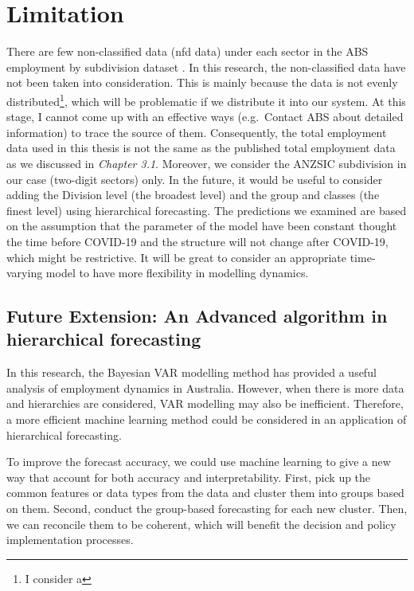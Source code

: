 \documentclass{monashthesis}
\begin{document}
\hypertarget{limitation}{%
\section{Limitation}\label{limitation}}

There are few non-classified data (nfd data) under each sector in the ABS employment by subdivision dataset \autocite{ABS2022}. In this research, the non-classified data have not been taken into consideration. This is mainly because the data is not evenly distributed\footnote{I consider a}, which will be problematic if we distribute it into our system. At this stage, I cannot come up with an effective ways (e.g.~Contact ABS about detailed information) to trace the source of them. Consequently, the total employment data used in this thesis is not the same as the published total employment data as we discussed in \emph{Chapter 3.1}. Moreover, we consider the ANZSIC subdivision in our case (two-digit sectors) only. In the future, it would be useful to consider adding the Division level (the broadest level) and the group and classes (the finest level) using hierarchical forecasting. The predictions we examined are based on the assumption that the parameter of the model have been constant thought the time before COVID-19 and the structure will not change after COVID-19, which might be restrictive. It will be great to consider an appropriate time-varying model to have more flexibility in modelling dynamics.

\hypertarget{future-extension-an-advanced-algorithm-in-hierarchical-forecasting}{%
\subsection{Future Extension: An Advanced algorithm in hierarchical forecasting}\label{future-extension-an-advanced-algorithm-in-hierarchical-forecasting}}

In this research, the Bayesian VAR modelling method has provided a useful analysis of employment dynamics in Australia. However, when there is more data and hierarchies are considered, VAR modelling may also be inefficient. Therefore, a more efficient machine learning method could be considered in an application of hierarchical forecasting.

To improve the forecast accuracy, we could use machine learning to give a new way that account for both accuracy and interpretability. First, pick up the common features or data types from the data and cluster them into groups based on them. Second, conduct the group-based forecasting for each new cluster. Then, we can reconcile them to be coherent, which will benefit the decision and policy implementation processes.
\end{document}
